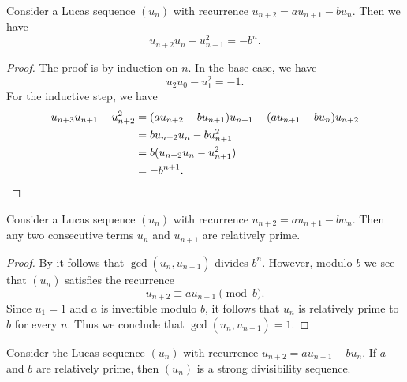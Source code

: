 \begin{proposition}\label{lemma:cassinis-identity}
  Consider a Lucas sequence $(u_n)$ with recurrence $u_{n+2}=au_{n+1}-bu_n$. Then we have
  \begin{equation*}
    u_{n+2}u_n-u_{n+1}^2=-b^{n}.
  \end{equation*}
\end{proposition}

\begin{proof}
  The proof is by induction on $n$. In the base case, we have
  \begin{equation*}
    u_{2}u_0-u_{1}^2=-1.
  \end{equation*}
  For the inductive step, we have
  \begin{align*}
    u_{n+3}u_{n+1}-u_{n+2}^2
    & = (au_{n+2}-bu_{n+1})u_{n+1}-(au_{n+1}-bu_n)u_{n+2} \\
    & = bu_{n+2}u_n-bu_{n+1}^2 \\
    & = b(u_{n+2}u_n-u_{n+1}^2) \\
    & = -b^{n+1}.\qedhere
  \end{align*}
\end{proof}

\begin{corollary}
  Consider a Lucas sequence $(u_n)$ with recurrence $u_{n+2}=au_{n+1}-bu_n$. Then any two consecutive terms $u_n$ and $u_{n+1}$ are relatively prime.
\end{corollary}

\begin{proof}
  By  it follows that $\gcd(u_n,u_{n+1})$ divides $b^n$. However, modulo $b$ we see that $(u_n)$ satisfies the recurrence
  \begin{equation*}
    u_{n+2}\equiv a u_{n+1}\pmod{b}.
  \end{equation*}
  Since $u_1=1$ and $a$ is invertible modulo $b$, it follows that $u_n$ is relatively prime to $b$ for every $n$. Thus we conclude that $\gcd(u_n,u_{n+1})=1$.
\end{proof}

\begin{theorem}
  Consider the Lucas sequence $(u_n)$ with recurrence $u_{n+2}=au_{n+1}-bu_n$. If $a$ and $b$ are relatively prime, then $(u_n)$ is a strong divisibility sequence.
\end{theorem}

